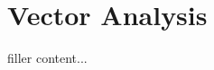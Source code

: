 \documentclass[../../templates/section]{subfiles}
\begin{document}
\section{Vector Analysis}\label{sec:vector-analysis}

filler content...
\end{document}
